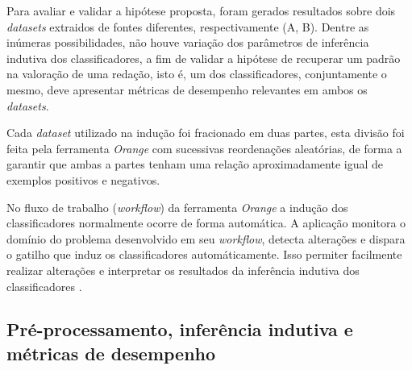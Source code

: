 Para avaliar e validar a hipótese proposta, foram gerados resultados sobre dois 
\textit{datasets} extraidos de fontes diferentes, respectivamente (A, B).
Dentre as inúmeras possibilidades, não houve variação dos parâmetros de 
inferência indutiva dos classificadores, a fim de validar a hipótese de 
recuperar um padrão na valoração de uma redação, isto é, um dos 
classificadores, conjuntamente o mesmo, deve apresentar métricas de desempenho 
relevantes em ambos os \textit{datasets}.

Cada \textit{dataset} utilizado na indução foi fracionado em duas partes, esta 
divisão foi feita pela ferramenta \textit{Orange} com sucessivas reordenações 
aleatórias, de forma a garantir que ambas a partes tenham uma relação 
aproximadamente igual de exemplos positivos e negativos.

No fluxo de trabalho (\textit{workflow}) da ferramenta \textit{Orange} a 
indução dos classificadores normalmente ocorre de forma automática. A aplicação
monitora o domínio do problema desenvolvido em seu \textit{workflow}, detecta 
alterações e dispara o gatilho que induz os classificadores automáticamente. 
Isso permiter facilmente realizar alterações e interpretar os resultados da 
inferência indutiva dos classificadores \cite{orange_doc}. 

\subsection{Pré-processamento, inferência indutiva e métricas de desempenho}


